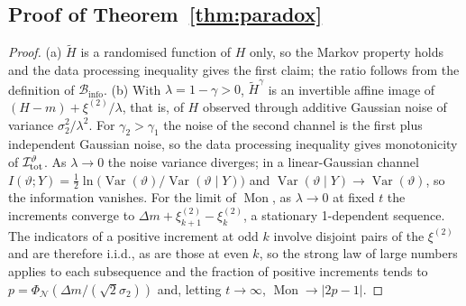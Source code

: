 \documentclass[preprint,12pt]{elsarticle}
\theoremstyle{definition}
\newcommand{\Binfo}{\mathcal{B}_{\mathrm{info}}}
\DeclareMathOperator{\Mon}{Mon}
\DeclareMathOperator{\Var}{Var}
\begin{document}
\subsection{Proof of Theorem~\ref{thm:paradox}}
\begin{proof}
(a) $\tilde H$ is a randomised function of $H$ only, so the Markov property holds and the data processing inequality gives the first claim; the ratio follows from the definition of $\Binfo$. (b) With $\lambda=1-\gamma>0$, $\tilde H^\gamma$ is an invertible affine image of $(H-m)+\xi^{(2)}/\lambda$, that is, of $H$ observed through additive Gaussian noise of variance $\sigma_2^2/\lambda^2$. For $\gamma_2>\gamma_1$ the noise of the second channel is the first plus independent Gaussian noise, so the data processing inequality \cite[Sect.~2.8]{cover2006} gives monotonicity of $\mathcal I_{\rm tot}^\vartheta$. As $\lambda\to0$ the noise variance diverges; in a linear-Gaussian channel $I(\vartheta;Y)=\tfrac12\ln\big(\Var(\vartheta)/\Var(\vartheta\mid Y)\big)$ \cite[Chap.~9]{cover2006} and $\Var(\vartheta\mid Y)\to\Var(\vartheta)$, so the information vanishes. For the limit of $\Mon$, as $\lambda\to0$ at fixed $t$ the increments converge to $\Delta m+\xi^{(2)}_{k+1}-\xi^{(2)}_k$, a stationary 1-dependent sequence. The indicators of a positive increment at odd $k$ involve disjoint pairs of the $\xi^{(2)}$ and are therefore i.i.d., as are those at even $k$, so the strong law of large numbers \cite[Chap.~2]{durrett2010} applies to each subsequence and the fraction of positive increments tends to $p=\Phi_{\mathcal N}(\Delta m/(\sqrt2\sigma_2))$ and, letting $t\to\infty$, $\Mon\to|2p-1|$.
\end{proof}
\end{document}
